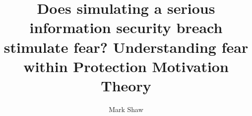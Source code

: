 \documentclass[10pt,a4paper]{article}
\author{Mark Shaw}
\title{Does simulating a serious information security breach stimulate fear? Understanding fear within Protection Motivation Theory}
\begin{document}
\maketitle

\begin{abstract}


\end{abstract}
\end{document}
